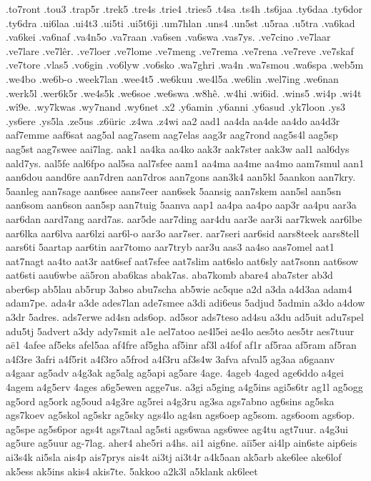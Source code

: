 .to7ront
.tou3
.trap5r
.trek5
.tre4s
.trie4
.tries5
.t4sa
.ts4h
.ts6jaa
.ty6daa
.ty6dor
.ty6dra
.ui6laa
.ui4t3
.ui5ti
.ui5t6ji
.um7hlan
.uns4
.un5st
.u5raa
.u5tra
.va6kad
.va6kei
.va6naf
.va4n5o
.va7raan
.va6sen
.va6swa
.vas7ys.
.ve7cino
.ve7laar
.ve7lare
.ve7lêr.
.ve7loer
.ve7lome
.ve7meng
.ve7rema
.ve7rena
.ve7reve
.ve7skaf
.ve7tore
.vlas5
.vo6gin
.vo6lyw
.vo6sko
.wa7ghri
.wa4n
.wa7smou
.wa6spa
.web5m
.we4bo
.we6b-o
.week7lan
.wee4t5
.we6kuu
.we4l5a
.we6lin
.wel7ing
.we6nan
.werk5l
.wer6k5r
.we4s5k
.we6soe
.we6swa
.w8hê.
.w4hi
.wi6id.
.wins5
.wi4p
.wi4t
.wî9e.
.wy7kwas
.wy7nand
.wy6net
.x2
.y6amin
.y6anni
.y6asud
.yk7loon
.ys3
.ys6ere
.ys5la
.ze5us
.z6üric
.z4wa
.z4wi
aa2
aad1
aa4da
aa4de
aa4do
aa4d3r
aaf7emme
aaf6sat
aag5al
aag7asem
aag7elas
aag3r
aag7rond
aag5s4l
aag5sp
aag5st
aag7swee
aai7lag.
aak1
aa4ka
aa4ko
aak3r
aak7ster
aak3w
aal1
aal6dys
aald7ys.
aal5fe
aal6fpo
aal5sa
aal7sfee
aam1
aa4ma
aa4me
aa4mo
aam7smul
aan1
aan6dou
aand6re
aan7dren
aan7dros
aan7gons
aan3k4
aan5kl
5aankon
aan7kry.
5aanleg
aan7sage
aan6see
aans7eer
aan6sek
5aansig
aan7skem
aan5sl
aan5sn
aan6som
aan6son
aan5sp
aan7tuig
5aanva
aap1
aa4pa
aa4po
aap3r
aa4pu
aar3a
aar6dan
aard7ang
aard7as.
aar5de
aar7ding
aar4du
aar3e
aar3i
aar7kwek
aar6lbe
aar6lka
aar6lva
aar6lzi
aar6l-o
aar3o
aar7ser.
aar7seri
aar6sid
aars8teek
aars8tell
aars6ti
5aartap
aar6tin
aar7tomo
aar7tryb
aar3u
aas3
aa4so
aas7omel
aat1
aat7nagt
aa4to
aat3r
aat6sef
aat7sfee
aat7slim
aat6slo
aat6sly
aat7sonn
aat6sow
aat6sti
aau6wbe
aä5ron
aba6kas
abak7as.
aba7komb
abare4
aba7ster
ab3d
aber6sp
ab5lau
ab5rup
3abso
abu7scha
ab5wie
ac5que
a2d
a3da
a4d3aa
adam4
adam7pe.
ada4r
a3de
ades7lan
ade7smee
a3di
adi6eus
5adjud
5admin
a3do
a4dow
a3dr
5adres.
ads7erwe
ad4sn
ads6op.
ad5sor
ads7teso
ad4su
a3du
ad5uit
adu7spel
adu5tj
5advert
a3dy
ady7smit
a1e
ael7atoo
ae4l5ei
ae4lo
aes5to
aes5tr
aes7tuur
aë1
4afee
af5eks
afel5aa
af4fre
af5gha
af5inr
af3l
a4fof
af1r
af5raa
af5ram
af5ran
a4f3re
3afri
a4f5rit
a4f3ro
a5frod
a4f3ru
af3s4w
3afva
afval5
ag3aa
a6gaanv
a4gaar
ag5adv
a4g3ak
ag5alg
ag5api
ag5are
4age.
4ageb
4aged
age6ddo
a4gei
4agem
a4g5erv
4ages
a6g5ewen
agge7us.
a3gi
a5ging
a4g5ins
agi5s6tr
ag1l
ag5ogg
ag5ord
ag5ork
ag5oud
a4g3re
ag5rei
a4g3ru
ag3sa
ags7abno
ag6sins
ag5ska
ags7koev
ag5skol
ag5skr
ag5sky
ags4lo
ag4sn
ags6oep
ag5som.
ags6oom
ags6op.
ag5spe
ag5s6por
ags4t
ags7taal
ag5sti
ags6waa
ags6wee
ag4tu
agt7uur.
a4g3ui
ag5ure
ag5uur
ag-7lag.
aher4
ahe5ri
a4hs.
ai1
aig6ne.
aiï5er
ai4lp
ain6ste
aip6eis
ai3s4k
ai5sla
ais4p
ais7prys
ais4t
ai3tj
ai3t4r
a4k5aan
ak5arb
ake6lee
ake6lof
ak5ess
ak5ins
akis4
akis7te.
5akkoo
a2k3l
a5klank
ak6leet
